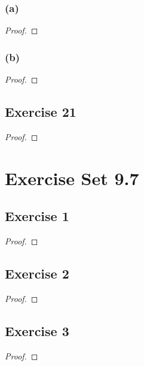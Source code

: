 \documentclass[14pt]{extarticle}
\begin{document}
\subsubsection{(a)}

\begin{proof}

\end{proof}

\subsubsection{(b)}

\begin{proof}

\end{proof}

\subsection{Exercise 21}

\begin{proof}

\end{proof}

\section{Exercise Set 9.7}

\subsection{Exercise 1}

\begin{proof}

\end{proof}

\subsection{Exercise 2}

\begin{proof}

\end{proof}

\subsection{Exercise 3}

\begin{proof}

\end{proof}
\end{document}
